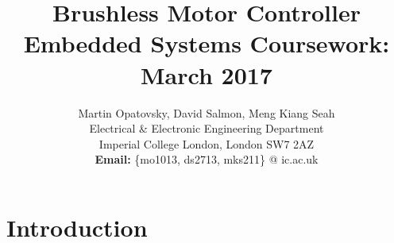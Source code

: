 \documentclass[a4paper, 10pt, conference]{ieeeconf}
\title{\LARGE \bf Brushless Motor Controller
\\ \normalsize Embedded Systems Coursework: March 2017}
\author{Martin Opatovsky, David Salmon, Meng Kiang Seah\\
Electrical \& Electronic Engineering Department\\
Imperial College London, London SW7 2AZ\\
\textbf{Email:} \{mo1013, ds2713, mks211\} @ ic.ac.uk\\
}
\begin{document}
\maketitle

\begin{abstract}

\end{abstract}

\section{Introduction}




\end{document}
